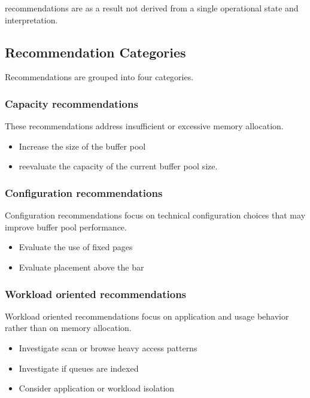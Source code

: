 recommendations are as a result not derived from a single operational state and interpretation. 

\subsection{Recommendation Categories}

Recommendations are grouped into four categories.

\subsubsection{Capacity recommendations}

These recommendations address insufficient or excessive memory allocation.

\begin{itemize}
    \item Increase the size of the buffer pool
    \item reevaluate the capacity of the current buffer pool size.
\end{itemize}

\subsubsection{Configuration recommendations}

Configuration recommendations focus on technical configuration choices that may improve buffer pool performance.

\begin{itemize}
    \item Evaluate the use of fixed pages
    \item Evaluate placement above the bar
\end{itemize}

\subsubsection{Workload oriented recommendations}

Workload oriented recommendations focus on application and usage behavior rather than on memory allocation.

\begin{itemize}
    \item Investigate scan or browse heavy access patterns
    \item Investigate if queues are indexed
    \item Consider application or workload isolation
\end{itemize}

